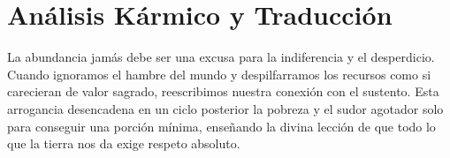 \section{Análisis Kármico y Traducción}
\begin{figure}
  \vspace{-1.5em}
  \begin{center}
  \end{center}
  \vspace{-1.5em}
\end{figure}
La abundancia jamás debe ser una excusa para la indiferencia y el desperdicio. Cuando ignoramos el hambre del mundo y despilfarramos los recursos como si carecieran de valor sagrado, reescribimos nuestra conexión con el sustento. Esta arrogancia desencadena en un ciclo posterior la pobreza y el sudor agotador solo para conseguir una porción mínima, enseñando la divina lección de que todo lo que la tierra nos da exige respeto absoluto.

